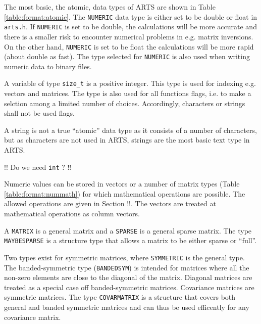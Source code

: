  \label{sec:formats:atomic}

 The most basic, the atomic, data types of ARTS are shown in Table
 \ref{table:format:atomic}. The \verb|NUMERIC| data type is either
 set to be double or float in \verb|arts.h|. If \verb|NUMERIC| is set
 to be double, the calculations will be more accurate and there is a
 smaller risk to encounter numerical problems in e.g. matrix inversions.
 On the other hand, \verb|NUMERIC| is set to be float the calculations
 will be more rapid (about double as fast). The type selected for
 \verb|NUMERIC| is also used when writing numeric data to binary files.
 
 A variable of type \verb|size_t| is a positive integer. This type is
 used for indexing e.g. vectors and matrices. The type is also used
 for all functions flags, i.e. to make a selction among a limited number of
 choices. Accordingly, characters or strings shall not be used flags. 

 A string is not a true ``atomic'' data type as it consists of a number
 of characters, but as characters are not used in ARTS, strings are
 the most basic text type in ARTS.
  
 !! Do we need  \verb|int| ? !!


 \label{sec:formats:nummath}
 
 Numeric values can be stored in vectors or a number of matrix types
 (Table \ref{table:format:nummath}) for which mathematical operations
 are possible. The allowed operations are given in Section !!.
 The vectors are treated at mathematical operations as column vectors.
 
 A \verb|MATRIX| is a general matrix and a \verb|SPARSE| is a general
 sparse matrix. The type \verb|MAYBESPARSE| is a structure type that
 allows a matrix to be either sparse or ``full''. 
 
 Two types exist for symmetric matrices, where \verb|SYMMETRIC| is the
 general type. The banded-symmetric type (\verb|BANDEDSYM|) is
 intended for matrices where all the non-zero elements are close to
 the diagonal of the matrix. Diagonal matrices are treated as a
 special case off banded-symmetric matrices. Covariance matrices are
 symmetric matrices. The type \verb|COVARMATRIX| is a structure that
 covers both general and banded symmetric matrices and can thus be
 used efficently for any covariance matrix.


 \label{sec:formats:atomic_arrays}
 
